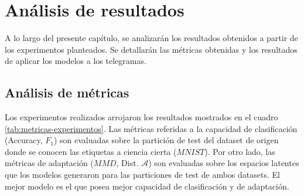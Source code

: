\chapter{An\'alisis de resultados}

\label{Chapter4}

A lo largo del presente cap\'itulo, se analizar\'an los resultados obtenidos a partir de los experimentos planteados.
Se detallar\'an las m\'etricas obtenidas y los resultados de aplicar los modelos a los telegramas.

\section{An\'alisis de m\'etricas}

Los experimentos realizados arrojaron los resultados mostrados en el cuadro \ref{tab:metricas-experimentos}. Las
m\'etricas referidas a la capacidad de clasificaci\'on (Accuracy, $F_1$) son evaluadas sobre la partici\'on de test del
dataset de origen donde se conocen las etiquetas a ciencia cierta ($MNIST$). Por otro lado, las m\'etricas de
adaptaci\'on ($MMD$, Dist. $\mathcal{A}$) son evaluadas sobre los espacios latentes que los modelos generaron para las
particiones de test de ambos datasets. El mejor modelo es el que posea mejor capacidad de clasificaci\'on y de
adaptaci\'on.

